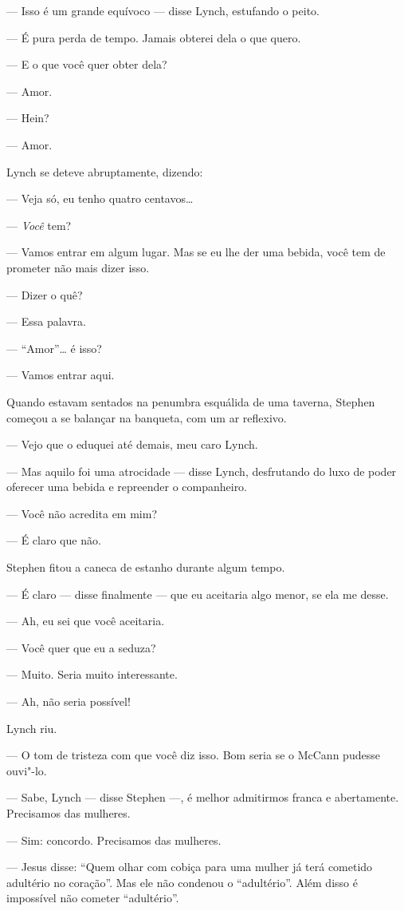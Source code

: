 --- Isso é um grande equívoco --- disse Lynch, estufando o peito.

--- É pura perda de tempo.  Jamais obterei dela o que quero.  

--- E o que você quer obter dela?

--- Amor.

--- Hein?

--- Amor.

Lynch se deteve abruptamente, dizendo:

--- Veja só, eu tenho quatro centavos\ldots{}

--- \textit{Você} tem?

--- Vamos entrar em algum lugar.  Mas se eu lhe der uma bebida, você tem de
prometer não mais dizer isso.

--- Dizer o quê?

--- Essa palavra.

--- “Amor”\ldots{} é isso?

--- Vamos entrar aqui.

Quando estavam sentados na penumbra esquálida de uma taverna, Stephen começou a
se balançar na banqueta, com um ar reflexivo.

--- Vejo que o eduquei até demais, meu caro Lynch.

--- Mas aquilo foi uma atrocidade --- disse Lynch, desfrutando do luxo de poder
oferecer uma bebida e repreender o companheiro.

--- Você não acredita em mim?

--- É claro que não.

Stephen fitou a caneca de estanho durante algum tempo.

--- É claro --- disse finalmente --- que eu aceitaria algo menor, se ela me
desse.

--- Ah, eu sei que você aceitaria.

--- Você quer que eu a seduza?

--- Muito.  Seria muito interessante.

--- Ah, não seria possível!

Lynch riu.

--- O tom de tristeza com que você diz isso.  Bom seria se o McCann pudesse
ouvi"-lo.

--- Sabe, Lynch --- disse Stephen ---, é melhor admitirmos franca e
abertamente.  Precisamos das mulheres.

--- Sim: concordo.  Precisamos das mulheres.

--- Jesus disse: “Quem olhar com cobiça para uma mulher já terá cometido
adultério no coração”.  Mas ele não condenou o “adultério”.  Além disso é
impossível não cometer “adultério”.

